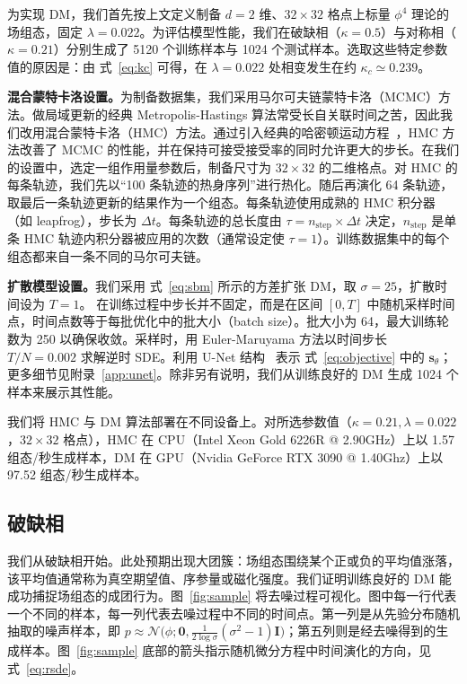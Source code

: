 为实现 DM，我们首先按上文定义制备 $d=2$ 维、$32 \times 32$ 格点上标量 $\phi^4$ 理论的场组态，固定 $\lambda = 0.022$。为评估模型性能，我们在破缺相（$\kappa = 0.5$）与对称相（$\kappa = 0.21$）分别生成了 5120 个训练样本与 1024 个测试样本。选取这些特定参数值的原因是：由 式~\eqref{eq:kc} 可得，在 $\lambda = 0.022$ 处相变发生在约 $\kappa_c \simeq 0.239$。

\textbf{混合蒙特卡洛设置。}为制备数据集，我们采用马尔可夫链蒙特卡洛（MCMC）方法。做局域更新的经典 Metropolis-Hastings 算法常受长自关联时间之苦，因此我们改用混合蒙特卡洛（HMC）方法。通过引入经典的哈密顿运动方程~\cite{neal2011mcmc}，HMC 方法改善了 MCMC 的性能，并在保持可接受接受率的同时允许更大的步长。在我们的设置中，选定一组作用量参数后，制备尺寸为 $32 \times 32$ 的二维格点。对 HMC 的每条轨迹，我们先以``100 条轨迹的热身序列''进行热化。随后再演化 64 条轨迹，取最后一条轨迹更新的结果作为一个组态。每条轨迹使用成熟的 HMC 积分器（如 leapfrog），步长为 $\Delta t$。每条轨迹的总长度由 $\tau = n_\text{step} \times \Delta t$ 决定，$n_\text{step}$ 是单条 HMC 轨迹内积分器被应用的次数（通常设定使 $\tau = 1$）。训练数据集中的每个组态都来自一条不同的马尔可夫链。

\textbf{扩散模型设置。}我们采用 式~\eqref{eq:sbm} 所示的方差扩张 DM，取 $\sigma = 25$，扩散时间设为 $T = 1$。
在训练过程中步长并不固定，而是在区间 $[0,T]$ 中随机采样时间点，时间点数等于每批优化中的批大小（batch size）。批大小为 64，最大训练轮数为 250 以确保收敛。采样时，用 Euler-Maruyama 方法以时间步长 $T/N = 0.002$ 求解逆时 SDE。利用 U-Net 结构~\cite{Ronneberger:2015unet} 表示 式~\eqref{eq:objective} 中的 $\mathbf{s}_\theta$；更多细节见附录~\ref{app:unet}。除非另有说明，我们从训练良好的 DM 生成 1024 个样本来展示其性能。

{我们将 HMC 与 DM 算法部署在不同设备上。对所选参数值（$\kappa = 0.21, \lambda = 0.022$，$32\times 32$ 格点），HMC 在 CPU（Intel Xeon Gold 6226R @ 2.90GHz）上以 1.57 组态/秒生成样本，DM 在 GPU（Nvidia GeForce RTX 3090 @ 1.40Ghz）上以 97.52 组态/秒生成样本。}

\subsection{破缺相}

我们从破缺相开始。此处预期出现大团簇：场组态围绕某个正或负的平均值涨落，该平均值通常称为真空期望值、序参量或磁化强度。我们证明训练良好的 DM 能成功捕捉场组态的成团行为。图~\ref{fig:sample} 将去噪过程可视化。图中每一行代表一个不同的样本，每一列代表去噪过程中不同的时间点。第一列是从先验分布随机抽取的噪声样本，即 $p \approx \mathcal{N}\bigg(\phi; \mathbf{0}, \frac{1}{2\log \sigma}(\sigma^{2} - 1) \mathbf{I}\bigg)$；第五列则是经去噪得到的生成样本。图~\ref{fig:sample} 底部的箭头指示随机微分方程中时间演化的方向，见 式~\eqref{eq:rsde}。

